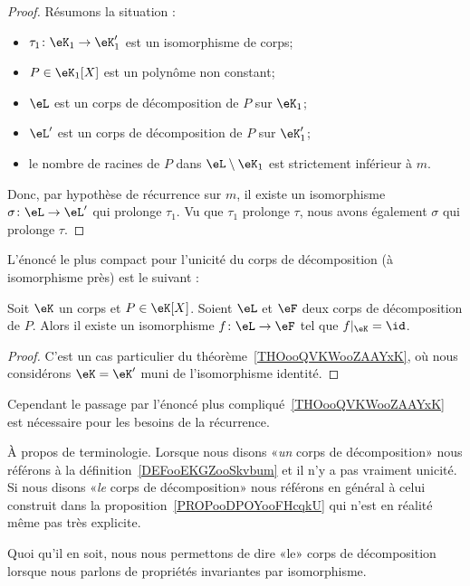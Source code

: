 \begin{proof}
	Résumons la situation :
	\begin{itemize}
		\item \( \tau_1\colon \eK_1\to \eK'_1\) est un isomorphisme de corps;
		\item \( P\in \eK_1[X]\) est un polynôme non constant;
		\item \( \eL\) est un corps de décomposition de \( P\) sur \( \eK_1\);
		\item \( \eL'\) est un corps de décomposition de \( P\) sur \( \eK'_1\);
		\item le nombre de racines de \( P\) dans \( \eL\setminus \eK_1\) est strictement inférieur à \( m\).
	\end{itemize}
	Donc, par hypothèse de récurrence sur \( m\), il existe un isomorphisme \( \sigma\colon \eL\to \eL'\) qui prolonge \( \tau_1\). Vu que \( \tau_1\) prolonge \( \tau\), nous avons également \( \sigma\) qui prolonge \( \tau\).
\end{proof}

L'énoncé le plus compact pour l'unicité du corps de décomposition (à isomorphisme près) est le suivant :
\begin{proposition}     \label{PropTMkfyM}
	Soit \( \eK\) un corps et \( P\in\eK[X]\). Soient \( \eL\) et \( \eF\) deux corps de décomposition de \( P\). Alors il existe un isomorphisme \( f\colon \eL\to \eF\) tel que \( f|_{\eK}=\id\).
\end{proposition}
\begin{proof}
	C'est un cas particulier du théorème~\ref{THOooQVKWooZAAYxK}, où nous considérons \( \eK=\eK'\) muni de l'isomorphisme identité.
\end{proof}

Cependant le passage par l'énoncé plus compliqué~\ref{THOooQVKWooZAAYxK} est nécessaire pour les besoins de la récurrence.

\begin{normaltext}
	À propos de terminologie. Lorsque nous disons «\emph{un} corps de décomposition» nous référons à la définition~\ref{DEFooEKGZooSkvbum} et il n'y a pas vraiment unicité. Si nous disons «\emph{le} corps de décomposition» nous référons en général à celui construit dans la proposition~\ref{PROPooDPOYooFHcqkU} qui n'est en réalité même pas très explicite.

	Quoi qu'il en soit, nous nous permettons de dire «le» corps de décomposition lorsque nous parlons de propriétés invariantes par isomorphisme.
\end{normaltext}

